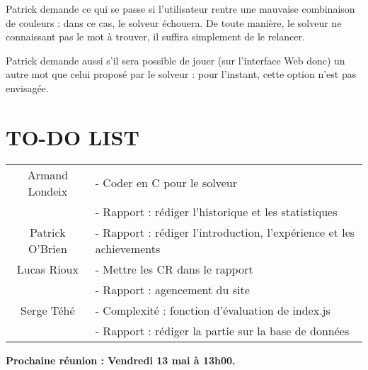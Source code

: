 \tabto{1cm}Patrick demande ce qui se passe si l’utilisateur rentre une mauvaise combinaison de couleurs : dans ce cas, le solveur échouera. De toute manière, le solveur ne connaissant pas le mot à trouver, il suffira simplement de le relancer.

\tabto{1cm}Patrick demande aussi s’il sera possible de jouer (sur l’interface Web donc) un autre mot que celui proposé par le solveur : pour l’instant, cette option n’est pas envisagée.


\section*{TO-DO LIST}

\begin{center}
\begin{tabular}{|c|l|}
    \hline
    Armand Londeix & - Coder en C pour le solveur \\
    & - Rapport : rédiger l’historique et les statistiques \\
    \hline
    Patrick O'Brien & - Rapport : rédiger l’introduction, l’expérience et les achievements \\ 
    \hline
    Lucas Rioux & - Mettre les CR dans le rapport \\
    & - Rapport : agencement du site \\
    \hline
    Serge Téhé & - Complexité : fonction d’évaluation de index.js \\
    & - Rapport : rédiger la partie sur la base de données \\

    \hline
\end{tabular}
\end{center}

\tabto{0cm}\textbf{Prochaine réunion : Vendredi 13 mai à 13h00.}